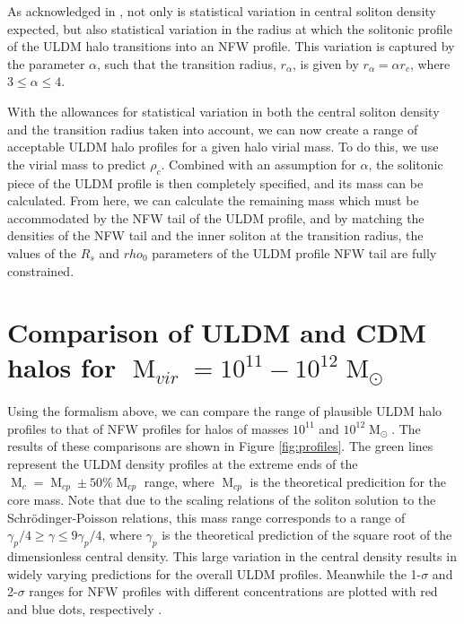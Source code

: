 \documentclass[a4paper,11pt]{article}
\begin{document}
As acknowledged in \cite{Robles:2018fur}, not only is statistical variation in central soliton density expected, but also statistical variation in the radius at which the solitonic profile of the ULDM halo transitions into an NFW profile. This variation is captured by the parameter $\alpha$, such that the transition radius, $r_{\alpha}$, is given by $r_{\alpha} = \alpha r_c$, where $3 \leq \alpha \leq 4$.

With the allowances for statistical variation in both the central soliton density and the transition radius taken into account, we can now create a range of acceptable ULDM halo profiles for a given halo virial mass. To do this, we use the virial mass to predict $\rho_c$. Combined with an assumption for $\alpha$, the solitonic piece of the ULDM profile is then completely specified, and its mass can be calculated. From here, we can calculate the remaining mass which must be accommodated by the NFW tail of the ULDM profile, and by matching the densities of the NFW tail and the inner soliton at the transition radius, the values of the $R_s$ and $rho_0$ parameters of the ULDM profile NFW tail are fully constrained. 

\section{Comparison of ULDM and CDM halos for $\operatorname{M}_{vir} = 10^{11} -  10^{12} \operatorname{M}_{\odot}$}

Using the formalism above, we can compare the range of plausible ULDM halo profiles to that of NFW profiles for halos of masses $10^{11}$ and $10^{12} \operatorname{M}_{\odot}$. The results of these comparisons are shown in Figure \ref{fig:profiles}. The green lines represent the ULDM density profiles at the extreme ends of the $\operatorname{M}_c = \operatorname{M}_{cp} \pm 50 \% \operatorname{M}_{cp}$ range, where $\operatorname{M}_{cp}$ is the theoretical predicition for the core mass. Note that due to the scaling relations of the soliton solution to the Schr{\"o}dinger-Poisson relations, this mass range corresponds to a range of $ \gamma_p /4 \geq \gamma \leq 9\gamma_p/4$, where $\gamma_p$ is the theoretical prediction of the square root of the dimensionless central density. This large variation in the central density results in widely varying predictions for the overall ULDM profiles. Meanwhile the 1-$\sigma$ and 2-$\sigma$ ranges for NFW profiles with different concentrations are plotted with red and blue dots, respectively \cite{Maccio:2008pcd}. 
\end{document}
